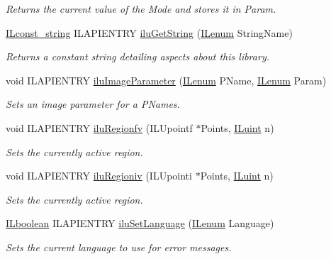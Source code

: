 \begin{DoxyCompactItemize}
\begin{DoxyCompactList}\small\item\em Returns the current value of the {\itshape Mode} and stores it in {\itshape Param}. \end{DoxyCompactList}\item 
\hyperlink{group__il__types_ga1aa1edc3eb344e14acacb02bade24a5a}{I\+Lconst\+\_\+string} I\+L\+A\+P\+I\+E\+N\+T\+R\+Y \hyperlink{group__ilu__state_ga8c572ee3c422dfcc4991aeff712d1804}{ilu\+Get\+String} (\hyperlink{group__il__types_ga62ca73445716183ef42b1f3906a45ed0}{I\+Lenum} String\+Name)
\begin{DoxyCompactList}\small\item\em Returns a constant string detailing aspects about this library. \end{DoxyCompactList}\item 
void I\+L\+A\+P\+I\+E\+N\+T\+R\+Y \hyperlink{group__ilu__state_ga1f7db294cdcd2a8285ae24c29bb1f750}{ilu\+Image\+Parameter} (\hyperlink{group__il__types_ga62ca73445716183ef42b1f3906a45ed0}{I\+Lenum} P\+Name, \hyperlink{group__il__types_ga62ca73445716183ef42b1f3906a45ed0}{I\+Lenum} Param)
\begin{DoxyCompactList}\small\item\em Sets an image parameter for a {\itshape P\+Names}. \end{DoxyCompactList}\item 
void I\+L\+A\+P\+I\+E\+N\+T\+R\+Y \hyperlink{group__ilu__state_gaa26c0daed6573bf4a1c8f8146de2dbfc}{ilu\+Regionfv} (I\+L\+Upointf $\ast$Points, \hyperlink{group__il__types_gaff8e86a1072c8d7cfe387fb87c6ed8e1}{I\+Luint} n)
\begin{DoxyCompactList}\small\item\em Sets the currently active region. \end{DoxyCompactList}\item 
void I\+L\+A\+P\+I\+E\+N\+T\+R\+Y \hyperlink{group__ilu__state_gaf22304a1fa0728ee5fadf4d92effdb50}{ilu\+Regioniv} (I\+L\+Upointi $\ast$Points, \hyperlink{group__il__types_gaff8e86a1072c8d7cfe387fb87c6ed8e1}{I\+Luint} n)
\begin{DoxyCompactList}\small\item\em Sets the currently active region. \end{DoxyCompactList}\item 
\hyperlink{group__il__types_gaa6aa7c95cfdc06b4d8601ef832b7bb0a}{I\+Lboolean} I\+L\+A\+P\+I\+E\+N\+T\+R\+Y \hyperlink{group__ilu__state_ga4c2e7c06c4a5677dbe58cba9c5ed075e}{ilu\+Set\+Language} (\hyperlink{group__il__types_ga62ca73445716183ef42b1f3906a45ed0}{I\+Lenum} Language)
\begin{DoxyCompactList}\small\item\em Sets the current language to use for error messages. \end{DoxyCompactList}\end{DoxyCompactItemize}


